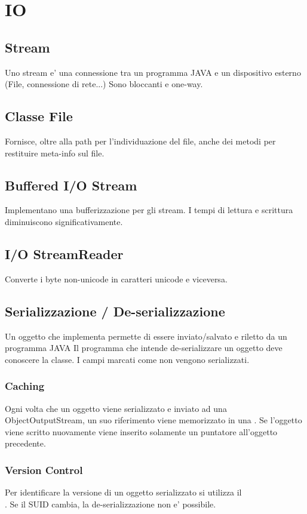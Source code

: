 \chapter{IO}
\section{Stream}
Uno stream e' una connessione tra un programma JAVA e un dispositivo esterno (File, connessione di rete...)
Sono bloccanti e one-way.
\section{Classe File}
Fornisce, oltre alla path per l'individuazione del file, anche dei metodi per restituire meta-info sul file.
\section{Buffered I/O Stream}
Implementano una bufferizzazione per gli stream. I tempi di lettura e scrittura diminuiscono significativamente.
\section{I/O StreamReader}
Converte i byte non-unicode in caratteri unicode e viceversa.
\section{Serializzazione / De-serializzazione}
Un oggetto che implementa  permette di essere inviato/salvato e riletto da un programma JAVA
Il programma che intende de-serializzare un oggetto deve conoscere la classe.
I campi marcati come  non vengono serializzati.
\subsection{Caching}
Ogni volta che un oggetto viene serializzato e inviato ad una ObjectOutputStream, un suo riferimento viene memorizzato in una .
Se l'oggetto viene scritto nuovamente viene inserito solamente un puntatore all'oggetto precedente.
\subsection{Version Control}
Per identificare la versione di un oggetto serializzato si utilizza il \\.
Se il SUID cambia, la de-serializzazione non e' possibile.
